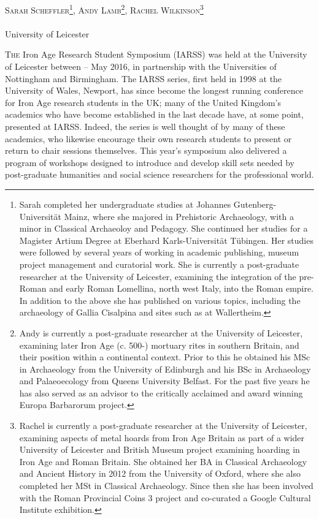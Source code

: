 \documentclass[ngerman,english]{ijsra}
\def\affiliation{University of Leicester}
\begin{document}
\IJSRAopening%
	{\Large\scshape
    Sarah Scheffler\footnote{Sarah  completed her undergraduate studies at Johannes Gutenberg-Universität Mainz, where she majored in Prehistoric Archaeology, with a minor in Classical Archaeoloy and Pedagogy. She continued her studies for a Magister Artium Degree at Eberhard Karls-Universität Tübingen. Her studies were followed by several years of working in academic publishing, museum project management and curatorial work. She is currently a post-graduate researcher at the University of Leicester, examining the integration of the pre-Roman and early Roman Lomellina, north west Italy, into the Roman empire. In addition to the above she has published on various topics, including the archaeology of Gallia Cisalpina and sites such as at Wallertheim.},
    Andy Lamb\footnote{Andy is currently a post-graduate researcher at the University of Leicester, examining later Iron Age (c. 500\BC-) mortuary rites in southern Britain, and their position within a continental context. Prior to this he obtained his MSc in Archaeology from the University of Edinburgh and his BSc in Archaeology and Palaeoecology from Queens University Belfast. For the past five years he has also served as an advisor to the critically acclaimed and award winning Europa Barbarorum project.},
    Rachel Wilkinson\footnote{Rachel is currently a post-graduate researcher at the University of Leicester, examining aspects of metal hoards from Iron Age Britain as part of a wider University of Leicester and British Museum project examining hoarding in Iron Age and Roman Britain. She obtained her BA in Classical Archaeology and Ancient History in 2012 from the University of Oxford, where she also completed her MSt in Classical Archaeology.  
    Since then she has been involved with the Roman Provincial Coins 3 project and co-curated a Google Cultural Institute exhibition.}
}
	\\[1em]
	\email\\
	\affiliation
\IJSRAmid%





\begin{IJSRAabstract}

\end{IJSRAabstract}

\lettrine[nindent=0em,lines=3]{T}{he}  Iron Age Research Student Symposium (IARSS) was held at the University of Leicester between  -- May 2016, in partnership with the Universities of Nottingham and Birmingham. 
The IARSS series, first held in 1998 at the University of Wales, Newport, has since become the longest running conference for Iron Age research students in the UK; many of the United Kingdom’s academics who have become established in the last decade have, at some point, presented at IARSS. Indeed, the series is well thought of by many of these academics, who likewise encourage their own research students to present or return to chair sessions themselves. 
This year’s symposium also delivered a program of workshops designed to introduce and develop skill sets needed by post-graduate humanities and social science researchers for the professional world.
\end{document}
